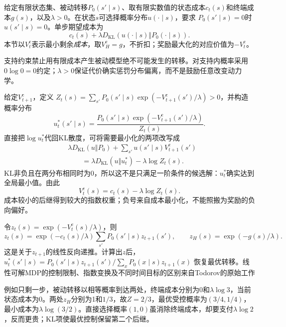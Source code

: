 \begin{definition}[有限时域KL控制]
 \label{def:rl-planning-kl-control}
 给定有限状态集、被动转移$P_0(s'\mid s)$、取有限实数值的状态成本$c_t(s)$和终端成本$g(s)$，以及$\lambda>0$。在状态$s$可选择概率分布$u(\cdot\mid s)$，要求
 $P_0(s'\mid s)=0$时$u(s'\mid s)=0$。单步期望成本为
 \[
 c_t(s)+\lambda D_{\mathrm{KL}}(u(\cdot\mid s)\Vert P_0(\cdot\mid s)).
 \]
 本节以$V_t^{\mathrm c}$表示最小剩余\emph{成本}，取$V_H^{\mathrm c}=g$，不折扣；奖励最大化的对应价值为$-V_t^{\mathrm c}$。
\end{definition}

支持约束禁止用有限成本产生被动模型绝不可能发生的转移。对支持内概率采用$0\log0=0$约定；$\lambda>0$保证代价确实惩罚分布偏离，而不是鼓励任意改变动力学。

给定$V_{t+1}^{\mathrm c}$，定义
$Z_t(s)=\sum_{s'}P_0(s'\mid s)\exp(-V_{t+1}^{\mathrm c}(s')/\lambda)>0$，并构造概率分布
\[
 u_t^*(s'\mid s)=
 \frac{P_0(s'\mid s)\exp(-V_{t+1}^{\mathrm c}(s')/\lambda)}{Z_t(s)}.
\]
直接把$\log u_t^*$代回KL散度，可将需要最小化的两项改写成
\begin{equation}
 \begin{aligned}
 &\lambda D_{\mathrm{KL}}(u\Vert P_0)
       +\sum_{s'}u(s'\mid s)V_{t+1}^{\mathrm c}(s')\\
 &\qquad=\lambda D_{\mathrm{KL}}(u\Vert u_t^*)-\lambda\log Z_t(s).
 \end{aligned}
 \label{eq:rl-planning-kl-completion}
\end{equation}
KL非负且在两分布相同时为0，所以这不是只满足一阶条件的候选解：$u_t^*$确实达到全局最小值。由此
\[
 V_t^{\mathrm c}(s)=c_t(s)-\lambda\log Z_t(s).
\]
成本较小的后继得到较大的指数权重；负号来自成本最小化，不能照搬为奖励的负向偏好。

令$z_t(s)=\exp(-V_t^{\mathrm c}(s)/\lambda)$，则
\begin{equation}
 z_t(s)=\exp(-c_t(s)/\lambda)\sum_{s'}P_0(s'\mid s)z_{t+1}(s'),
 \qquad z_H(s)=\exp(-g(s)/\lambda).
 \label{eq:rl-planning-kl-linear}
\end{equation}
这是关于$z_{t+1}$的线性反向递推。计算出$z$后，
$u_t^*(s'\mid s)=P_0(s'\mid s)z_{t+1}(s')/\sum_xP_0(x\mid s)z_{t+1}(x)$
恢复最优转移。线性可解MDP的控制限制、指数变换及不同时间目标的区别来自Todorov的原始工作

例如只剩一步，被动转移以相等概率到达两处，终端成本分别为0和$\lambda\log3$，当前状态成本为0。两处$z_H$分别为1和$1/3$，故$Z=2/3$，最优受控概率为$(3/4,1/4)$，最小成本为$\lambda\log(3/2)$。直接选择概率$(1,0)$虽消除终端成本，却要支付$\lambda\log2$，反而更贵；KL项使最优控制保留第二个后继。

